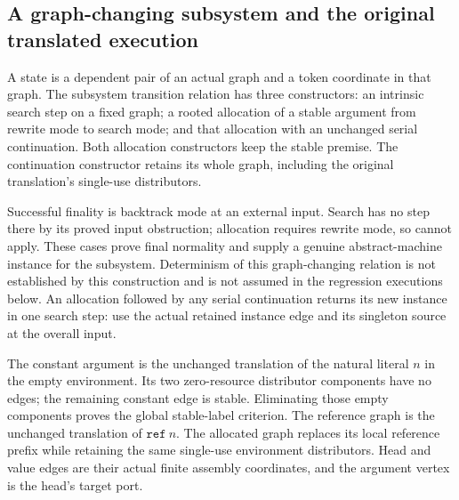 \subsection{A graph-changing subsystem and the original translated execution}

A state is a dependent pair of an actual graph and a token coordinate in that
graph. The subsystem transition relation has three constructors: an intrinsic
search step on a fixed graph; a rooted allocation of a stable argument from
rewrite mode to search mode; and that allocation with an unchanged serial
continuation. Both allocation constructors keep the stable premise. The
continuation constructor retains its whole graph, including the original
translation's single-use distributors.

Successful finality is backtrack mode at an external input. Search has no
step there by its proved input obstruction; allocation requires rewrite mode,
so cannot apply. These cases prove final normality and supply a genuine
abstract-machine instance for the subsystem. Determinism of this graph-changing
relation is not established by this construction and is not assumed in the
regression executions below. An allocation followed by any serial continuation
returns its new instance in one search step: use the actual retained instance
edge and its singleton source at the overall input.






The constant argument is the unchanged translation of the natural literal
$n$ in the empty environment. Its two zero-resource distributor components have
no edges; the remaining constant edge is stable. Eliminating those empty
components proves the global stable-label criterion. The reference graph is
the unchanged translation of $\mathtt{ref}\ n$. The allocated graph replaces
its local reference prefix while retaining the same single-use environment
distributors. Head and value edges are their actual finite assembly coordinates,
and the argument vertex is the head's target port.

